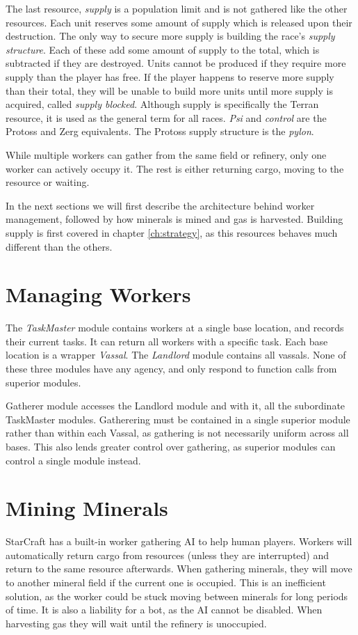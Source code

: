The last resource, \emph{supply} is a population limit and is not gathered like the other resources. Each unit reserves some amount of supply which is released upon their destruction. The only way to secure more supply is building the race's \emph{supply structure}. Each of these add some amount of supply to the total, which is subtracted if they are destroyed. Units cannot be produced if they require more supply than the player has free. If the player happens to reserve more supply than their total, they will be unable to build more units until more supply is acquired, called \emph{supply blocked}. Although supply is specifically the Terran resource, it is used as the general term for all races. \emph{Psi} and \emph{control} are the Protoss and Zerg equivalents. The Protoss supply structure is the \emph{pylon}.

While multiple workers can gather from the same field or refinery, only one worker can actively occupy it. The rest is either returning cargo, moving to the resource or waiting.

In the next sections we will first describe the architecture behind worker management, followed by how minerals is mined and gas is harvested. Building supply is first covered in chapter \ref{ch:strategy}, as this resources behaves much different than the others.

\section{Managing Workers}

The \emph{TaskMaster} module contains workers at a single base location, and records their current tasks. It can return all workers with a specific task. Each base location is a wrapper \emph{Vassal}. The \emph{Landlord} module contains all vassals. None of these three modules have any agency, and only respond to function calls from superior modules.


Gatherer module accesses the Landlord module and with it, all the subordinate TaskMaster modules. Gatherering must be contained in a single superior module rather than within each Vassal, as gathering is not necessarily uniform across all bases. This also lends greater control over gathering, as superior modules can control a single module instead.

\section{Mining Minerals}
StarCraft has a built-in worker gathering AI to help human players. Workers will automatically return cargo from resources (unless they are interrupted) and return to the same resource afterwards. When gathering minerals, they will move to another mineral field if the current one is occupied. This is an inefficient solution, as the worker could be stuck moving between minerals for long periods of time. It is also a liability for a bot, as the AI cannot be disabled. When harvesting gas they will wait until the refinery is unoccupied.

